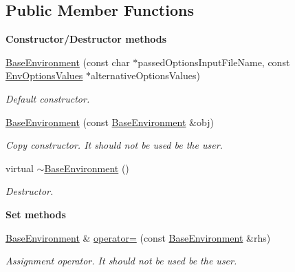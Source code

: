 \subsection*{Public Member Functions}
\begin{Indent}{\bf Constructor/\-Destructor methods}\par
\begin{DoxyCompactItemize}
\item 
\hyperlink{class_q_u_e_s_o_1_1_base_environment_a8261e797e696fdf379b0532a930db499}{Base\-Environment} (const char $\ast$passed\-Options\-Input\-File\-Name, const \hyperlink{class_q_u_e_s_o_1_1_env_options_values}{Env\-Options\-Values} $\ast$alternative\-Options\-Values)
\begin{DoxyCompactList}\small\item\em Default constructor. \end{DoxyCompactList}\item 
\hyperlink{class_q_u_e_s_o_1_1_base_environment_ab7ac89f144c0dd19217b2a137dcf1483}{Base\-Environment} (const \hyperlink{class_q_u_e_s_o_1_1_base_environment}{Base\-Environment} \&obj)
\begin{DoxyCompactList}\small\item\em Copy constructor. It should not be used be the user. \end{DoxyCompactList}\item 
virtual \hyperlink{class_q_u_e_s_o_1_1_base_environment_a769c44dce792c1c11f58031604e44504}{$\sim$\-Base\-Environment} ()
\begin{DoxyCompactList}\small\item\em Destructor. \end{DoxyCompactList}\end{DoxyCompactItemize}
\end{Indent}
\begin{Indent}{\bf Set methods}\par
\begin{DoxyCompactItemize}
\item 
\hyperlink{class_q_u_e_s_o_1_1_base_environment}{Base\-Environment} \& \hyperlink{class_q_u_e_s_o_1_1_base_environment_a10c162c73db616f600c82d9d09ca0f95}{operator=} (const \hyperlink{class_q_u_e_s_o_1_1_base_environment}{Base\-Environment} \&rhs)
\begin{DoxyCompactList}\small\item\em Assignment operator. It should not be used be the user. \end{DoxyCompactList}\end{DoxyCompactItemize}
\end{Indent}
